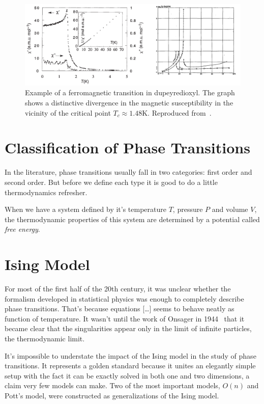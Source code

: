 \begin{figure}[h]
\begin{center}
    \includegraphics[scale=0.6]{chapters/ch2-crit/figs/suscep}
\end{center}
\caption{Example of a ferromagnetic transition in dupeyredioxyl. The graph
    shows a distinctive divergence in the magnetic susceptibility in the
    vicinity of the critical point $T_c\approx1.48$K. Reproduced
    from~\cite{Chiarelli1993}.}
\label{fig:suscep}
\end{figure}

\section{Classification of Phase Transitions}
\label{sec:classification}

In the literature, phase transitions usually fall in two categories: first
order and second order. But before we define each type it is good to do a
little thermodynamics refresher.

When we have a system defined by it's temperature $T$, pressure $P$ and
volume $V$, the thermodynamic properties of this system are determined
by a potential called \textit{free energy}.


\section{Ising Model}
\label{sec:ising}

For most of the first half of the 20th century, it was unclear whether the
formalism developed in statistical physics was enough to completely describe
phase transitions. That's because equations [\ldots] seems to behave neatly as
function of temperature. It wasn't until the work of Onsager in
1944~\cite{Onsager1944} that it became clear that the singularities appear only
in the limit of infinite particles, the thermodynamic limit.

It's impossible to understate the impact of the Ising model in the study of
phase transitions. It represents a golden standard because it unites an
elegantly simple setup with the fact it can be exactly solved in both one and
two dimensions, a claim very few models can make. Two of the most important
models, $O(n)$ and Pott's model, were constructed as generalizations of the
Ising model.

